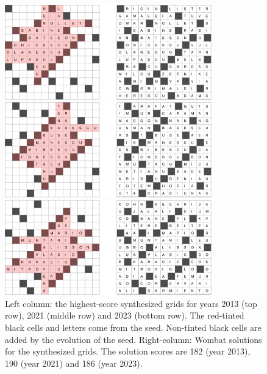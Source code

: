 \begin{figure}[t]
\centering
\includegraphics[width=0.8\textwidth]{_empiricalSupport/y-2013/results/_runWombat/mrmeGrids_y2013-60x932-14400x352-14113466-paper.pdf}

\vspace{0.25cm}

\includegraphics[width=0.8\textwidth]{_empiricalSupport/y-2021/results/_runWombat/mrmeGrids_feb3-60x38035-14400x224-13741779-paper.pdf}

\vspace{0.25cm}

\includegraphics[width=0.8\textwidth]{_empiricalSupport/y-2023/results/_runWombat/mrmeGrids_y2023-60x446-14400x352-14179462-paper.pdf}

\caption{Left column: the highest-score synthesized grids for years 2013 (top row), 2021 (middle row) and 2023 (bottom row). The red-tinted black cells and letters come from the seed. Non-tinted black cells are added by the evolution of the seed. Right-column: {\sc Wombat} solutions for the synthesized grids. The solution scores are 182 (year 2013), 190 (year 2021) and 186 (year 2023).}
\label{fig:results}
\end{figure}

